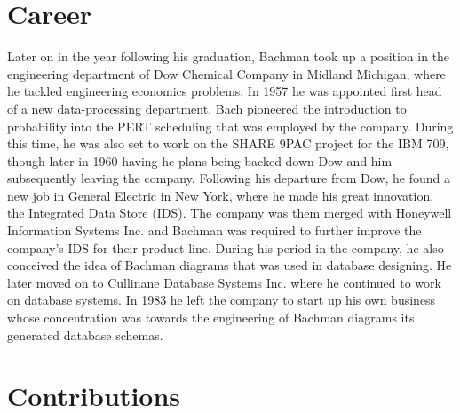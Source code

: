 \documentclass[a4paper]{article}
\begin{document}
\section{Career}
Later on in the year following his graduation, Bachman took up a position in the engineering department of Dow Chemical Company in Midland Michigan, where he tackled engineering economics problems. In 1957 he was appointed first head of a new data-processing department. Bach pioneered the introduction to probability into the PERT scheduling that was employed by the company. During this time, he was also set to work on the SHARE 9PAC project for the IBM 709, though later in 1960 having he plans being backed down Dow and him subsequently leaving the company.
\bigbreak
Following his departure from Dow, he found a new job in General Electric in New York, where he made his great innovation, the Integrated Data Store (IDS). The company was them merged with Honeywell Information Systems Inc. and Bachman was required to further improve the company's IDS for their product line\cite{histmuseam}. During his period in the company, he also conceived the idea of Bachman diagrams that was used in database designing.
\bigbreak
He later moved on to Cullinane Database Systems Inc. where he continued to work on database systems. In 1983 he left the company to start up his own business whose concentration was towards the engineering of Bachman diagrams its generated database schemas.  
\section{Contributions}
\end{document}
